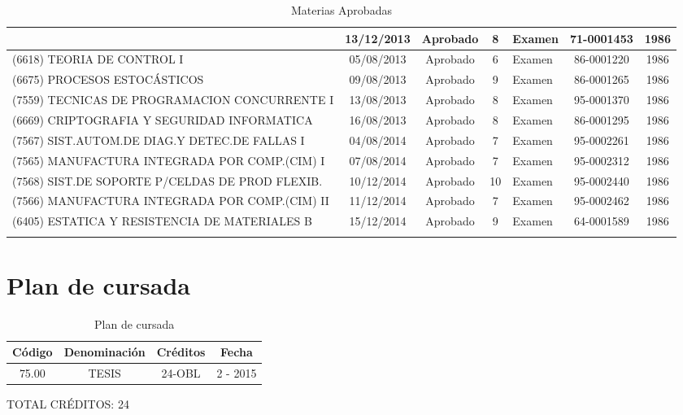 \documentclass[a4paper,10pt]{article}
\begin{document}
\begin{center}
\begin{longtable}{|p{3.5cm}|c|c|c|p{1.4cm}|c|c|}
			& 13/12/2013 & Aprobado & 8 & Examen & 71-0001453 & 1986 \\
			\hline
			(6618) TEORIA DE CONTROL I & 05/08/2013 & Aprobado & 6 & Examen & 
			86-0001220 & 1986 \\
			\hline
			(6675) PROCESOS ESTOCÁSTICOS & 09/08/2013 & Aprobado & 9 & Examen & 
			86-0001265 & 1986 \\
			\hline
			(7559) TECNICAS DE PROGRAMACION CONCURRENTE I & 13/08/2013 & 
			Aprobado & 8 & Examen & 95-0001370 & 1986 \\
			\hline
			(6669) CRIPTOGRAFIA Y SEGURIDAD INFORMATICA & 16/08/2013 & Aprobado
			& 8 & Examen & 86-0001295 & 1986 \\
			\hline
			(7567) SIST.AUTOM.DE DIAG.Y DETEC.DE FALLAS I & 04/08/2014 & 
			Aprobado & 7 & Examen & 95-0002261 & 1986 \\
			\hline
			(7565) MANUFACTURA INTEGRADA POR COMP.(CIM) I & 07/08/2014 & 
			Aprobado & 7 & Examen & 95-0002312 & 1986 \\
			\hline
			(7568) SIST.DE SOPORTE P/CELDAS DE PROD FLEXIB. & 10/12/2014 & 
			Aprobado & 10 & Examen & 95-0002440 & 1986 \\
			\hline
			(7566) MANUFACTURA INTEGRADA POR COMP.(CIM) II & 11/12/2014 & 
			Aprobado & 7 & Examen & 95-0002462 & 1986 \\
			\hline
			(6405) ESTATICA Y RESISTENCIA DE MATERIALES B & 15/12/2014 & 
			Aprobado & 9 & Examen & 64-0001589 & 1986 \\
			\hline
			\caption{Materias Aprobadas} \label{tab:matApr}
		\end{longtable}
	\end{center}
	\newpage
	\section{Plan de cursada}
	
	\begin{table}[!htb]
		\centering
		\begin{tabular}{|c|c|c|c|}
			\hline
			Código & Denominación & Créditos & Fecha \\
			\hline
			75.00 & TESIS & 24-OBL & 2 - 2015 \\
			\hline
		\end{tabular}
		\caption{Plan de cursada} \label{tabPlanCursada}
	\end{table}

	TOTAL CRÉDITOS: 24	
\end{document}
